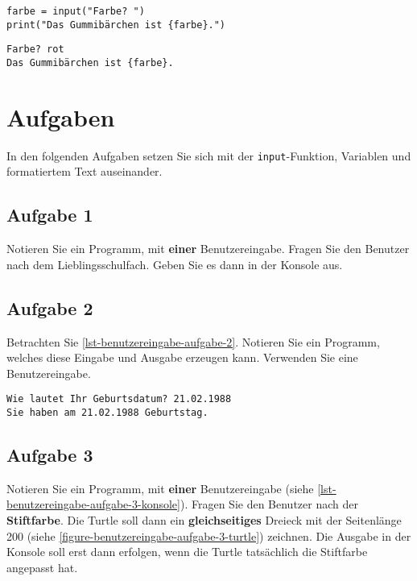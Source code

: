 \begin{lstlisting}[caption={Der Text wird so \textbf{nicht} korrekt formatiert.}, label={lst-f-text-example-4}]
farbe = input("Farbe? ")
print("Das Gummibärchen ist {farbe}.")
\end{lstlisting}

\begin{lstlisting}[caption={Die Ausgabe entspricht $1:1$ dem Text, jedes Zeichen wird ausgegeben.}, label=lst-f-text-example-output-2, language=output]
Farbe? rot
Das Gummibärchen ist {farbe}.
\end{lstlisting}

\section{Aufgaben}

In den folgenden Aufgaben setzen Sie sich mit der \lstinline{input}-Funktion, Variablen und formatiertem Text auseinander.

\subsection{Aufgabe 1}

Notieren Sie ein Programm, mit \textbf{einer} Benutzereingabe. Fragen Sie den Benutzer nach dem Lieblingsschulfach. Geben Sie es dann in der Konsole aus.

\fillwithgrid{0.75in}

\subsection{Aufgabe 2}

Betrachten Sie \autoref{lst-benutzereingabe-aufgabe-2}. Notieren Sie ein Programm, welches diese Eingabe und Ausgabe erzeugen kann. Verwenden Sie eine Benutzereingabe.

\begin{lstlisting}[caption={Eingabe und Ausgabe in der Konsole.}, label=lst-benutzereingabe-aufgabe-2, language=output]
Wie lautet Ihr Geburtsdatum? 21.02.1988
Sie haben am 21.02.1988 Geburtstag.
\end{lstlisting}

\fillwithgrid{0.75in}

\subsection{Aufgabe 3}

Notieren Sie ein Programm, mit \textbf{einer} Benutzereingabe (siehe \autoref{lst-benutzereingabe-aufgabe-3-konsole}). Fragen Sie den Benutzer nach der \textbf{Stiftfarbe}. Die Turtle soll dann ein \textbf{gleichseitiges} Dreieck mit der Seitenlänge \num{200} (siehe \autoref{figure-benutzereingabe-aufgabe-3-turtle}) zeichnen. Die Ausgabe in der Konsole soll erst dann erfolgen, wenn die Turtle tatsächlich die Stiftfarbe angepasst hat.

